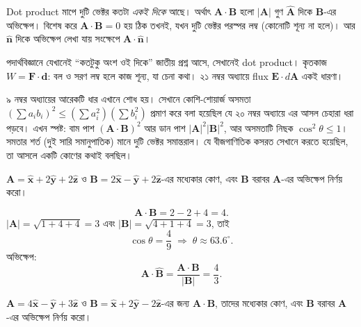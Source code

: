 \documentclass[11pt]{article}
\begin{document}
\begin{idea}[জ্যামিতিক অর্থ]
Dot product মাপে দুটি ভেক্টর কতটা \emph{একই দিকে} আছে।
অর্থাৎ $\mathbf{A}\cdot\mathbf{B}$ হলো $|\mathbf{A}|$ গুণ
$\hat{\mathbf{A}}$ দিকে $\mathbf{B}$-এর অভিক্ষেপ।
বিশেষ করে $\mathbf{A}\cdot\mathbf{B} = 0$ হয় ঠিক তখনই, যখন দুটি ভেক্টর
পরস্পর লম্ব (কোনোটি শূন্য না হলে)। আর $\hat{\mathbf{n}}$ দিকে অভিক্ষেপ
লেখা যায় সংক্ষেপে $\mathbf{A}\cdot\hat{\mathbf{n}}$।
\end{idea}

পদার্থবিজ্ঞানে যেখানেই ``কতটুকু অংশ ওই দিকে'' জাতীয় প্রশ্ন আসে, সেখানেই dot
product। কৃতকাজ $W = \mathbf{F}\cdot\mathbf{d}$: বল ও সরণ লম্ব হলে কাজ শূন্য,
যা চেনা কথা। ২১ নম্বর অধ্যায়ে flux $\mathbf{E}\cdot d\mathbf{A}$ একই
ধারণা।

\begin{remark}
৯ নম্বর অধ্যায়ের আরেকটি ধার এখানে শোধ হয়। সেখানে কোশি-শোয়ার্জ অসমতা
$\left( \sum a_{i}b_{i} \right)^{2} \leq \left( \sum a_{i}^{2} \right)
\left( \sum b_{i}^{2} \right)$ প্রমাণ করে বলা হয়েছিল যে ২০ নম্বর
অধ্যায়ে এর আসল চেহারা ধরা পড়বে। এখন স্পষ্ট: বাম পাশ
$\left( \mathbf{A}\cdot\mathbf{B} \right)^{2}$ আর ডান পাশ
$|\mathbf{A}|^{2}|\mathbf{B}|^{2}$, আর অসমতাটি নিছক $\cos^{2}\theta \leq 1$।
সমতার শর্ত (দুই সারি সমানুপাতিক) মানে দুটি ভেক্টর সমান্তরাল। যে বীজগাণিতিক
কসরত সেখানে করতে হয়েছিল, তা আসলে একটি কোণের কথাই বলছিল।
\end{remark}

\begin{example}
$\mathbf{A} = \hat{\mathbf{x}}+2\hat{\mathbf{y}}+2\hat{\mathbf{z}}$ ও
$\mathbf{B} = 2\hat{\mathbf{x}}-\hat{\mathbf{y}}+2\hat{\mathbf{z}}$-এর
মধ্যেকার কোণ, এবং $\mathbf{B}$ বরাবর $\mathbf{A}$-এর অভিক্ষেপ নির্ণয় করো।
\end{example}

\begin{solbox}
\[
  \mathbf{A}\cdot\mathbf{B} = 2 - 2 + 4 = 4 .
\]
$|\mathbf{A}| = \sqrt{1+4+4} = 3$ এবং $|\mathbf{B}| = \sqrt{4+1+4} = 3$, তাই
\[
  \cos\theta = \frac{4}{9} \;\Longrightarrow\; \theta \approx 63.6^{\circ} .
\]
অভিক্ষেপ:
\[
  \mathbf{A}\cdot\hat{\mathbf{B}} = \frac{\mathbf{A}\cdot\mathbf{B}}
  {|\mathbf{B}|} = \frac{4}{3} .
\]
\end{solbox}

 $\mathbf{A} = 4\hat{\mathbf{x}}-\hat{\mathbf{y}}+3\hat{\mathbf{z}}$
ও $\mathbf{B} = \hat{\mathbf{x}}+2\hat{\mathbf{y}}-2\hat{\mathbf{z}}$-এর
জন্য $\mathbf{A}\cdot\mathbf{B}$, তাদের মধ্যেকার কোণ, এবং $\mathbf{B}$ বরাবর
$\mathbf{A}$-এর অভিক্ষেপ নির্ণয় করো।
\end{document}
